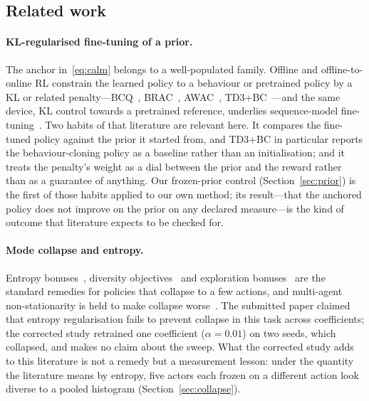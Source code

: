 \subsection{Related work}
\label{sec:bg_related}

\paragraph{KL-regularised fine-tuning of a prior.}
The anchor in~\eqref{eq:calm} belongs to a well-populated family. Offline and offline-to-online RL constrain the learned policy to a behaviour or pretrained policy by a KL or related penalty---BCQ~\cite{fujimoto2019off}, BRAC~\cite{wu2019brac}, AWAC~\cite{nair2020awac}, TD3+BC~\cite{fujimoto2021minimalist}---and the same device, KL control towards a pretrained reference, underlies sequence-model fine-tuning~\cite{jaques2017sequence,ziegler2019finetuning,ouyang2022training}. Two habits of that literature are relevant here. It compares the fine-tuned policy against the prior it started from, and TD3+BC in particular reports the behaviour-cloning policy as a baseline rather than an initialisation; and it treats the penalty's weight as a dial between the prior and the reward rather than as a guarantee of anything. Our frozen-prior control (Section~\ref{sec:prior}) is the first of those habits applied to our own method; its result---that the anchored policy does not improve on the prior on any declared measure---is the kind of outcome that literature expects to be checked for.

\paragraph{Mode collapse and entropy.}
Entropy bonuses~\cite{haarnoja2018soft,ahmed2019understanding}, diversity objectives~\cite{eysenbach2019diversity} and exploration bonuses~\cite{tang2017exploration} are the standard remedies for policies that collapse to a few actions, and multi-agent non-stationarity is held to make collapse worse~\cite{zhang2021multi}. The submitted paper claimed that entropy regularisation fails to prevent collapse in this task across coefficients; the corrected study retrained one coefficient ($\alpha=0.01$) on two seeds, which collapsed, and makes no claim about the sweep. What the corrected study adds to this literature is not a remedy but a measurement lesson: under the quantity the literature means by entropy, five actors each frozen on a different action look diverse to a pooled histogram (Section~\ref{sec:collapse}).

